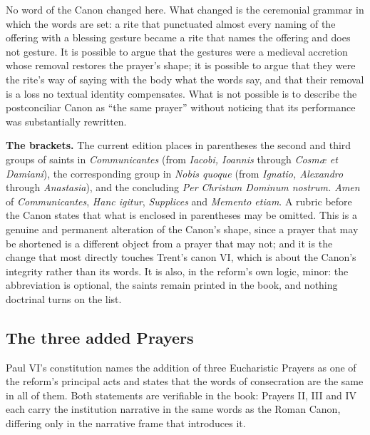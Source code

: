 No word of the Canon changed here. What changed is the ceremonial grammar in which the words are set: a rite that punctuated almost every naming of the offering with a blessing gesture became a rite that names the offering and does not gesture. It is possible to argue that the gestures were a medieval accretion whose removal restores the prayer's shape; it is possible to argue that they were the rite's way of saying with the body what the words say, and that their removal is a loss no textual identity compensates. What is not possible is to describe the postconciliar Canon as ``the same prayer'' without noticing that its performance was substantially rewritten.

\textbf{The brackets.} The current edition places in parentheses the second and third groups of saints in \emph{Communicantes} (from \emph{Iacobi, Ioannis} through \emph{Cosmæ et Damiani}), the corresponding group in \emph{Nobis quoque} (from \emph{Ignatio, Alexandro} through \emph{Anastasia}), and the concluding \emph{Per Christum Dominum nostrum. Amen} of \emph{Communicantes}, \emph{Hanc igitur}, \emph{Supplices} and \emph{Memento etiam}. A rubric before the Canon states that what is enclosed in parentheses may be omitted. This is a genuine and permanent alteration of the Canon's shape, since a prayer that may be shortened is a different object from a prayer that may not; and it is the change that most directly touches Trent's canon VI, which is about the Canon's integrity rather than its words. It is also, in the reform's own logic, minor: the abbreviation is optional, the saints remain printed in the book, and nothing doctrinal turns on the list.

\subsection{The three added Prayers}

Paul VI's constitution names the addition of three Eucharistic Prayers as one of the reform's principal acts and states that the words of consecration are the same in all of them. Both statements are verifiable in the book: Prayers II, III and IV each carry the institution narrative in the same words as the Roman Canon, differing only in the narrative frame that introduces it.

